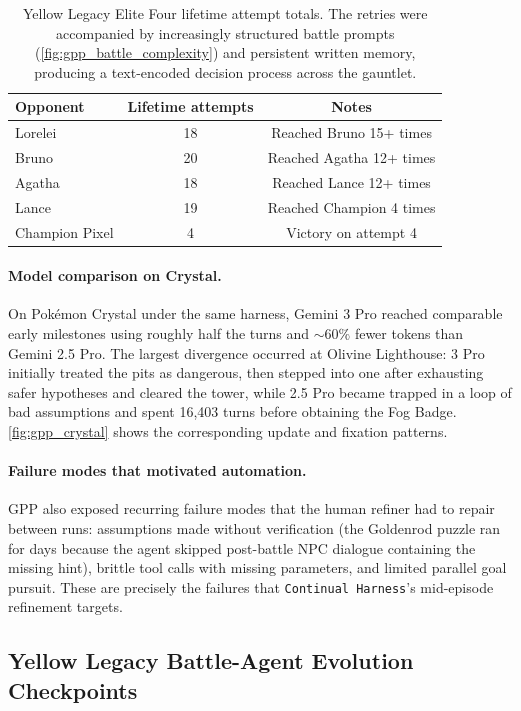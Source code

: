 \documentclass[11pt]{article}
\begin{document}
\begin{table}[t]
\centering
\small
\begin{tabular}{lcc}
\toprule
Opponent & Lifetime attempts & Notes \\
\midrule
Lorelei & 18 & Reached Bruno 15+ times \\
Bruno & 20 & Reached Agatha 12+ times \\
Agatha & 18 & Reached Lance 12+ times \\
Lance & 19 & Reached Champion 4 times \\
Champion Pixel & 4 & Victory on attempt 4 \\
\bottomrule
\end{tabular}
\caption{Yellow Legacy Elite Four lifetime attempt totals. The retries were accompanied by increasingly structured battle prompts (\cref{fig:gpp_battle_complexity}) and persistent written memory, producing a text-encoded decision process across the gauntlet.}
\label{tab:gpp_yellow_e4}
\end{table}

\paragraph{Model comparison on Crystal.} On Pok\'emon Crystal under the same harness, Gemini 3 Pro reached comparable early milestones using roughly half the turns and $\sim 60\%$ fewer tokens than Gemini 2.5 Pro. The largest divergence occurred at Olivine Lighthouse: 3 Pro initially treated the pits as dangerous, then stepped into one after exhausting safer hypotheses and cleared the tower, while 2.5 Pro became trapped in a loop of bad assumptions and spent 16{,}403 turns before obtaining the Fog Badge. \cref{fig:gpp_crystal} shows the corresponding update and fixation patterns.

\paragraph{Failure modes that motivated automation.} GPP also exposed recurring failure modes that the human refiner had to repair between runs: assumptions made without verification (the Goldenrod puzzle ran for days because the agent skipped post-battle NPC dialogue containing the missing hint), brittle tool calls with missing parameters, and limited parallel goal pursuit. These are precisely the failures that \texttt{Continual Harness}'s mid-episode refinement targets.

\subsection{Yellow Legacy Battle-Agent Evolution Checkpoints}\label{app:battle-agent-evolution}
\end{document}
